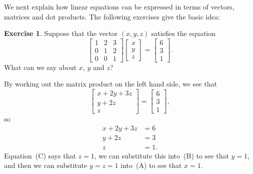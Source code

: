 \documentclass[a4paper]{book}
\theoremstyle{definition}
\newtheorem{exercise}[theorem]{Exercise}
\renewenvironment{solution}{\SolutionInline}{\endSolutionInline}
\begin{document}
We next explain how linear equations can be expressed in terms of
vectors, matrices and dot products.  The following exercises give the
basic idea:
\begin{exercise}
 Suppose that the vector $(x,y,z)$ satisfies the equation
 \[ \begin{bmatrix} 1&2&3 \\ 0&1&2 \\ 0&0&1 \end{bmatrix} 
    \begin{bmatrix} x \\ y \\ z \end{bmatrix}
     = \begin{bmatrix} 6 \\ 3 \\ 1 \end{bmatrix}.
 \]
 What can we say about $x$, $y$ and $z$?
\end{exercise}
\begin{solution}
 By working out the matrix product on the left hand side, we see that
 \[ \begin{bmatrix} x+2y+3z \\ y+2z \\ z \end{bmatrix}
    = \begin{bmatrix} 6 \\ 3 \\ 1 \end{bmatrix},
 \]
 so
 \begin{align*}
  x + 2y + 3z &= 6  \tag{A}\\
       y + 2z &= 3  \tag{B}\\
            z &= 1. \tag{C}
 \end{align*}
 Equation~(C) says that $z=1$, we can substitute this into~(B) to see
 that $y=1$, and then we can substitute $y=z=1$ into~(A) to see that
 $x=1$.
\end{solution}
\end{document}
